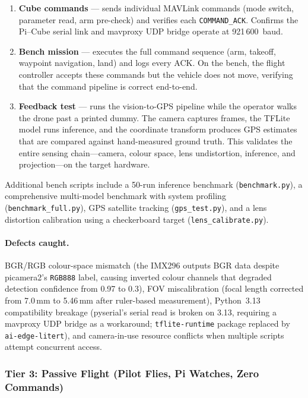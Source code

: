 \begin{enumerate}
    \item[\texttt{0a}] \textbf{Cube commands} --- sends individual MAVLink commands (mode switch, parameter read, arm pre-check) and verifies each \texttt{COMMAND\_ACK}. Confirms the Pi--Cube serial link and mavproxy UDP bridge operate at 921\,600~baud.
    \item[\texttt{0b}] \textbf{Bench mission} --- executes the full command sequence (arm, takeoff, waypoint navigation, land) and logs every ACK. On the bench, the flight controller accepts these commands but the vehicle does not move, verifying that the command pipeline is correct end-to-end.
    \item[\texttt{0c}] \textbf{Feedback test} --- runs the vision-to-GPS pipeline while the operator walks the drone past a printed dummy. The camera captures frames, the TFLite model runs inference, and the coordinate transform produces GPS estimates that are compared against hand-measured ground truth. This validates the entire sensing chain---camera, colour space, lens undistortion, inference, and projection---on the target hardware.
\end{enumerate}

Additional bench scripts include a 50-run inference benchmark (\texttt{benchmark.py}), a comprehensive multi-model benchmark with system profiling (\texttt{benchmark\_full.py}), GPS satellite tracking (\texttt{gps\_test.py}), and a lens distortion calibration using a checkerboard target (\texttt{lens\_calibrate.py}).

\paragraph{Defects caught.} BGR/RGB colour-space mismatch (the IMX296 outputs BGR data despite picamera2's \texttt{RGB888} label, causing inverted colour channels that degraded detection confidence from 0.97 to 0.3), FOV miscalibration (focal length corrected from 7.0\,mm to 5.46\,mm after ruler-based measurement), Python~3.13 compatibility breakage (pyserial's serial read is broken on 3.13, requiring a mavproxy UDP bridge as a workaround; \texttt{tflite-runtime} package replaced by \texttt{ai-edge-litert}), and camera-in-use resource conflicts when multiple scripts attempt concurrent access.

\subsubsection{Tier 3: Passive Flight (Pilot Flies, Pi Watches, Zero Commands)}

